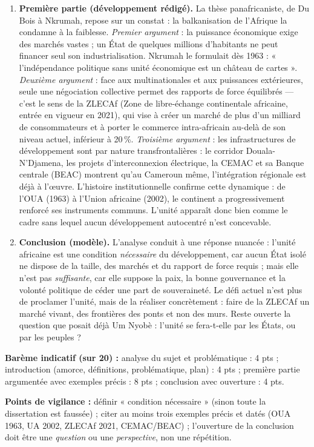 \documentclass[11pt]{article}
\begin{document}
\begin{corrige}
\begin{enumerate}
\item \textbf{Première partie (développement rédigé).} La thèse panafricaniste, de Du Bois à Nkrumah, repose sur un constat : la balkanisation de l'Afrique la condamne à la faiblesse. \emph{Premier argument} : la puissance économique exige des marchés vastes ; un État de quelques millions d'habitants ne peut financer seul son industrialisation. Nkrumah le formulait dès 1963 : « l'indépendance politique sans unité économique est un château de cartes ». \emph{Deuxième argument} : face aux multinationales et aux puissances extérieures, seule une négociation collective permet des rapports de force équilibrés — c'est le sens de la ZLECAf (Zone de libre-échange continentale africaine, entrée en vigueur en 2021), qui vise à créer un marché de plus d'un milliard de consommateurs et à porter le commerce intra-africain au-delà de son niveau actuel, inférieur à 20\,\%. \emph{Troisième argument} : les infrastructures de développement sont par nature transfrontalières : le corridor Douala-N'Djamena, les projets d'interconnexion électrique, la CEMAC et sa Banque centrale (BEAC) montrent qu'au Cameroun même, l'intégration régionale est déjà à l'œuvre. L'histoire institutionnelle confirme cette dynamique : de l'OUA (1963) à l'Union africaine (2002), le continent a progressivement renforcé ses instruments communs. L'unité apparaît donc bien comme le cadre sans lequel aucun développement autocentré n'est concevable.
\item \textbf{Conclusion (modèle).} L'analyse conduit à une réponse nuancée : l'unité africaine est une condition \emph{nécessaire} du développement, car aucun État isolé ne dispose de la taille, des marchés et du rapport de force requis ; mais elle n'est pas \emph{suffisante}, car elle suppose la paix, la bonne gouvernance et la volonté politique de céder une part de souveraineté. Le défi actuel n'est plus de proclamer l'unité, mais de la réaliser concrètement : faire de la ZLECAf un marché vivant, des frontières des ponts et non des murs. Reste ouverte la question que posait déjà Um Nyobè : l'unité se fera-t-elle par les États, ou par les peuples ?
\end{enumerate}

\textbf{Barème indicatif (sur 20) :} analyse du sujet et problématique : 4 pts ; introduction (amorce, définitions, problématique, plan) : 4 pts ; première partie argumentée avec exemples précis : 8 pts ; conclusion avec ouverture : 4 pts.

\textbf{Points de vigilance :} définir « condition nécessaire » (sinon toute la dissertation est faussée) ; citer au moins trois exemples précis et datés (OUA 1963, UA 2002, ZLECAf 2021, CEMAC/BEAC) ; l'ouverture de la conclusion doit être une \emph{question} ou une \emph{perspective}, non une répétition.
\end{corrige}
\end{document}
